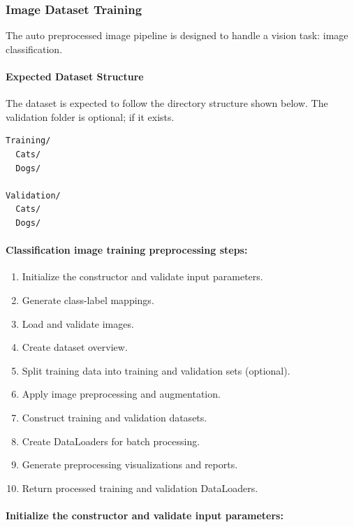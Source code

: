 \subsubsection{Image Dataset Training}
The auto preprocessed image pipeline is designed to handle a vision task: image classification.
\vspace{1cm}
\paragraph{Expected Dataset Structure}
The dataset is expected to follow the directory structure shown below. The validation folder is optional; if it exists.
\begin{verbatim}
Training/
  Cats/
  Dogs/

Validation/
  Cats/
  Dogs/
\end{verbatim}


\vspace{1cm}
\paragraph{Classification image training preprocessing steps:}\par
\begin{enumerate}
\item Initialize the constructor and validate input parameters.
  \item Generate class-label mappings.
    \item Load and validate images.
    \item Create dataset overview.
    \item Split training data into training and validation sets (optional).
    \item Apply image preprocessing and augmentation.
    \item Construct training and validation datasets.
    \item Create DataLoaders for batch processing.
    \item Generate preprocessing visualizations and reports.
    \item Return processed training and validation DataLoaders.
\end{enumerate}

\vspace{1cm}
\paragraph{Initialize the constructor and validate input parameters:}\par

